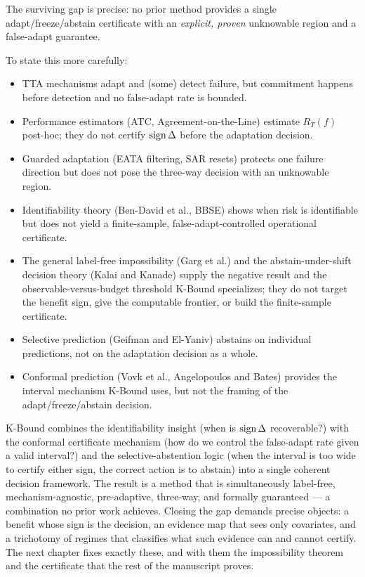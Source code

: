 The surviving gap is precise: no prior method provides a single
adapt/freeze/abstain certificate with an \emph{explicit, proven} unknowable
region and a false-adapt guarantee.

To state this more carefully:
\begin{itemize}
\item TTA mechanisms adapt and (some) detect failure, but commitment happens
    before detection and no false-adapt rate is bounded.
\item Performance estimators (ATC, Agreement-on-the-Line) estimate $R_T(f)$
    post-hoc; they do not certify $\operatorname{sign}\Delta$ before the adaptation decision.
\item Guarded adaptation (EATA filtering, SAR resets) protects one failure
    direction but does not pose the three-way decision with an unknowable
    region.
\item Identifiability theory (Ben-David et al., BBSE) shows when risk is
    identifiable but does not yield a finite-sample, false-adapt-controlled
    operational certificate.
\item The general label-free impossibility (Garg et al.) and the
    abstain-under-shift decision theory (Kalai and Kanade) supply the negative
    result and the observable-versus-budget threshold K-Bound specializes; they do
    not target the benefit sign, give the computable frontier, or build the
    finite-sample certificate.
\item Selective prediction (Geifman and El-Yaniv) abstains on individual
    predictions, not on the adaptation decision as a whole.
\item Conformal prediction (Vovk et al., Angelopoulos and Bates) provides the
    interval mechanism K-Bound uses, but not the framing of the
    adapt/freeze/abstain decision.
\end{itemize}

K-Bound combines the identifiability insight (when is $\operatorname{sign}\Delta$
recoverable?) with the conformal certificate mechanism (how do we control
the false-adapt rate given a valid interval?) and the selective-abstention
logic (when the interval is too wide to certify either sign, the correct
action is to abstain) into a single coherent decision framework.
The result is a method that is simultaneously label-free, mechanism-agnostic,
pre-adaptive, three-way, and formally guaranteed --- a combination no prior
work achieves.
Closing the gap demands precise objects: a benefit whose sign is the decision,
an evidence map that sees only covariates, and a trichotomy of regimes that
classifies what such evidence can and cannot certify. The next chapter fixes
exactly these, and with them the impossibility theorem and the certificate that
the rest of the manuscript proves.
